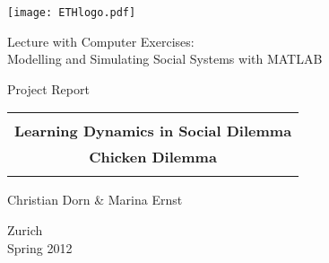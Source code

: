 
\thispagestyle{empty}

\begin{center}
\texttt{[image: ETHlogo.pdf]}

\bigskip


\bigskip


\bigskip


\LARGE{ 	Lecture with Computer Exercises:\\ }
\LARGE{ Modelling and Simulating Social Systems with MATLAB\\}

\bigskip

\bigskip

\small{Project Report}\\

\bigskip

\bigskip

\bigskip

\bigskip


\begin{tabular}{|c|}
\hline
\\
\textbf{\LARGE{Learning Dynamics in Social Dilemma}}\\
\textbf{\LARGE{Chicken Dilemma}}\\
\\
\hline
\end{tabular}
\bigskip

\bigskip

\bigskip

\LARGE{Christian Dorn \& Marina Ernst}



\bigskip

\bigskip

\bigskip

\bigskip

\bigskip

\bigskip

\bigskip

\bigskip

Zurich\\
Spring 2012\\

\end{center}


